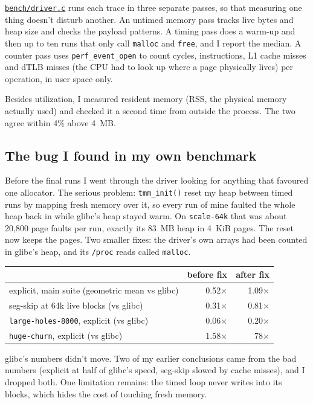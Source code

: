 \documentclass[11pt,letterpaper]{article}
\newcommand{\repo}{https://github.com/yazeed1s/tmalloc}
\newcommand{\src}[1]{\href{\repo/blob/main/#1}{\texttt{#1}}}
\begin{document}
\src{bench/driver.c} runs each trace in three separate passes, so that measuring one thing doesn't disturb another. An untimed memory pass tracks live bytes and heap size and checks the payload patterns. A timing pass does a warm-up and then up to ten runs that only call \texttt{malloc} and \texttt{free}, and I report the median. A counter pass uses \texttt{perf\_event\_open} to count cycles, instructions, L1 cache misses and dTLB misses (the CPU had to look up where a page physically lives) per operation, in user space only.

Besides utilization, I measured resident memory (RSS, the physical memory actually used) and checked it a second time from outside the process. The two agree within 4\% above 4~MB.

\subsection*{The bug I found in my own benchmark}
\label{sec:audit}

Before the final runs I went through the driver looking for anything that favoured one allocator. The serious problem: \texttt{tmm\_init()} reset my heap between timed runs by mapping fresh memory over it, so every run of mine faulted the whole heap back in while glibc's heap stayed warm. On \texttt{scale-64k} that was about 20,800 page faults per run, exactly its 83~MB heap in 4~KiB pages. The reset now keeps the pages. Two smaller fixes: the driver's own arrays had been counted in glibc's heap, and its \texttt{/proc} reads called \texttt{malloc}.

\begin{center}
\footnotesize
\begin{tabular}{@{}l r r@{}}
\toprule
 & before fix & after fix \\
\midrule
explicit, main suite (geometric mean vs glibc) & 0.52$\times$ & 1.09$\times$ \\
seg-skip at 64k live blocks (vs glibc) & 0.31$\times$ & 0.81$\times$ \\
\texttt{large-holes-8000}, explicit (vs glibc) & 0.06$\times$ & 0.20$\times$ \\
\texttt{huge-churn}, explicit (vs glibc) & 1.58$\times$ & 78$\times$ \\
\bottomrule
\end{tabular}
\end{center}

glibc's numbers didn't move. Two of my earlier conclusions came from the bad numbers (explicit at half of glibc's speed, seg-skip slowed by cache misses), and I dropped both. One limitation remains: the timed loop never writes into its blocks, which hides the cost of touching fresh memory.
\end{document}
